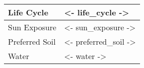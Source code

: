 \begin{table}[htt]
    \centering
    \begin{tabular}{||l|l||}
        \hline
         Life Cycle &  <- life_cycle -> \\ \hline
         Sun Exposure & <- sun_exposure -> \\ \hline
         Preferred Soil & <- preferred_soil -> \\ \hline
         Water & <- water -> \\ \hline
    \end{tabular}
    \label{tab:my_label}
\end{table}
